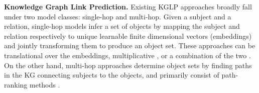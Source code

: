 \textbf{Knowledge Graph Link Prediction.}
Existing KGLP approaches broadly fall under two model classes: single-hop and multi-hop.
Given a subject and a relation, single-hop models infer a set of objects by mapping the subject and relation respectively to unique learnable finite dimensional vectors (embeddings) and jointly transforming them to produce an object set. These approaches can be translational \citep{bordes2013translating} over the embeddings, multiplicative \citep{yang2015embedding, trouillon2016complex}, or a combination of the two
\citep{dettmers2018conve, transr_ctranr, transd, tucker, coper, GAAT}.
On the other hand, multi-hop approaches determine object sets by finding paths in the KG connecting subjects to the objects, and primarily consist of path-ranking methods 
\citep{lao2011random, gardner2013improving, neelakantancompositional, guutraversing, toutanova2016compositional, minerva, salesforce}.

